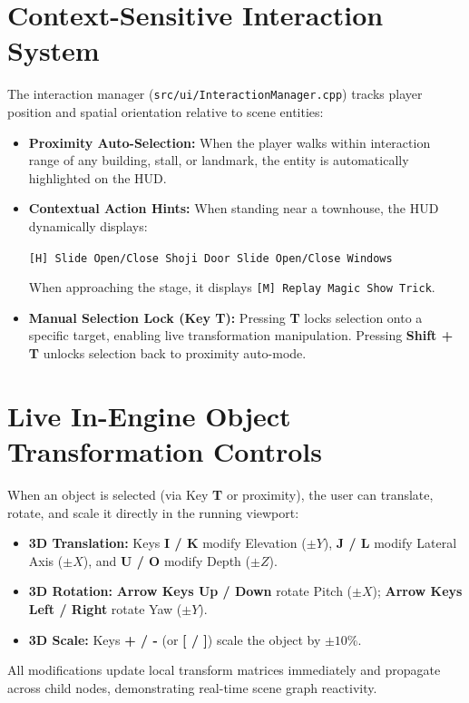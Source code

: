 \section{Context-Sensitive Interaction System}
The interaction manager (\texttt{src/ui/InteractionManager.cpp}) tracks player position and spatial orientation relative to scene entities:
\begin{itemize}
    \item \textbf{Proximity Auto-Selection:} When the player walks within interaction range of any building, stall, or landmark, the entity is automatically highlighted on the HUD.
    \item \textbf{Contextual Action Hints:} When standing near a townhouse, the HUD dynamically displays:
    \begin{center}
    \texttt{[H] Slide Open/Close Shoji Door \quad\quad [G] Slide Open/Close Windows}
    \end{center}
    When approaching the stage, it displays \texttt{[M] Replay Magic Show Trick}.
    \item \textbf{Manual Selection Lock (Key T):} Pressing \textbf{T} locks selection onto a specific target, enabling live transformation manipulation. Pressing \textbf{Shift + T} unlocks selection back to proximity auto-mode.
\end{itemize}

\section{Live In-Engine Object Transformation Controls}
When an object is selected (via Key \textbf{T} or proximity), the user can translate, rotate, and scale it directly in the running viewport:
\begin{itemize}
    \item \textbf{3D Translation:} Keys \textbf{I / K} modify Elevation ($\pm Y$), \textbf{J / L} modify Lateral Axis ($\pm X$), and \textbf{U / O} modify Depth ($\pm Z$).
    \item \textbf{3D Rotation:} \textbf{Arrow Keys Up / Down} rotate Pitch ($\pm X$); \textbf{Arrow Keys Left / Right} rotate Yaw ($\pm Y$).
    \item \textbf{3D Scale:} Keys \textbf{+ / -} (or \textbf{[ / ]}) scale the object by $\pm 10\%$.
\end{itemize}
All modifications update local transform matrices immediately and propagate across child nodes, demonstrating real-time scene graph reactivity.

